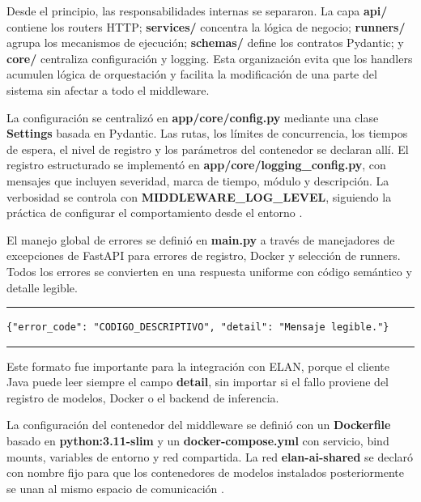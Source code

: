 \documentclass[11pt,a4paper]{article}
\begin{document}
Desde el principio, las responsabilidades internas se separaron. La capa \textbf{api/} contiene los routers HTTP; \textbf{services/} concentra la lógica de negocio; \textbf{runners/} agrupa los mecanismos de ejecución; \textbf{schemas/} define los contratos Pydantic; y \textbf{core/} centraliza configuración y logging. Esta organización evita que los handlers acumulen lógica de orquestación y facilita la modificación de una parte del sistema sin afectar a todo el middleware.

La configuración se centralizó en \textbf{app/core/config.py} mediante una clase \textbf{Settings} basada en Pydantic. Las rutas, los límites de concurrencia, los tiempos de espera, el nivel de registro y los parámetros del contenedor se declaran allí. El registro estructurado se implementó en \textbf{app/core/logging\_config.py}, con mensajes que incluyen severidad, marca de tiempo, módulo y descripción. La verbosidad se controla con \textbf{MIDDLEWARE\_LOG\_LEVEL}, siguiendo la práctica de configurar el comportamiento desde el entorno \cite{python_logging}.

El manejo global de errores se definió en \textbf{main.py} a través de manejadores de excepciones de FastAPI para errores de registro, Docker y selección de runners. Todos los errores se convierten en una respuesta uniforme con código semántico y detalle legible.

\begin{center}
\begin{minipage}{0.85\textwidth}
\hrule
\vspace{0.12cm}
\small
\begin{Verbatim}[baselinestretch=0.82]
{"error_code": "CODIGO_DESCRIPTIVO", "detail": "Mensaje legible."}
\end{Verbatim}
\vspace{0.05cm}
\hrule

\label{lst:error_response}
\end{minipage}
\end{center}

Este formato fue importante para la integración con ELAN, porque el cliente Java puede leer siempre el campo \textbf{detail}, sin importar si el fallo proviene del registro de modelos, Docker o el backend de inferencia.

La configuración del contenedor del middleware se definió con un \textbf{Dockerfile} basado en \textbf{python:3.11-slim} y un \textbf{docker-compose.yml} con servicio, bind mounts, variables de entorno y red compartida. La red \textbf{elan-ai-shared} se declaró con nombre fijo para que los contenedores de modelos instalados posteriormente se unan al mismo espacio de comunicación \cite{docker2026overview}.
\end{document}
